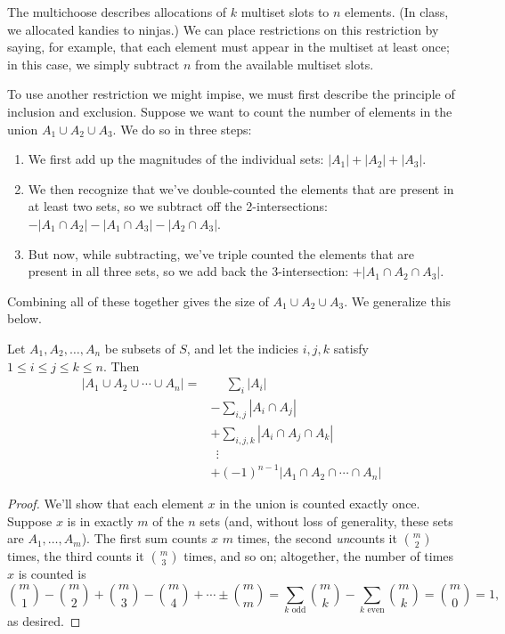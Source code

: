 \documentclass[../m055main.tex]{subfiles}
\begin{document}
The multichoose describes allocations of $k$ multiset slots to $n$ elements.
(In class, we allocated kandies to ninjas.)
We can place restrictions on this restriction by saying, for example, that each element must appear in the multiset at least once; in this case, we simply subtract $n$ from the available multiset slots.

To use another restriction we might impise, we must first describe the principle of inclusion and exclusion.
Suppose we want to count the number of elements in the union $A_1 \cup A_2 \cup A_3$.
We do so in three steps:
\begin{enumerate}
    \item We first add up the magnitudes of the individual sets: $|A_1| + |A_2| + |A_3|$.
    \item We then recognize that we've double-counted the elements that are present in at least two sets, so we subtract off the 2-intersections: $- |A_1 \cap A_2| - |A_1 \cap A_3| - |A_2 \cap A_3|$.
    \item But now, while subtracting, we've triple counted the elements that are present in all three sets, so we add back the 3-intersection: $+ |A_1 \cap A_2 \cap A_3|$.
\end{enumerate}
Combining all of these together gives the size of $A_1 \cup A_2 \cup A_3$.
We generalize this below.

\begin{theorem}
    Let $A_1, A_2, \ldots, A_n$ be subsets of $S$, and let the indicies $i,j,k$ satisfy $1 \leq i \leq j \leq k \leq n$.
    Then
    \begin{align*}
        |A_1 \cup A_2 \cup \cdots \cup A_n| =& \phantom{+}\sum_{i} |A_i| \\
        & - \sum_{i,j} |A_i \cap A_j| \\
        & + \sum_{i,j,k} |A_i \cap A_j \cap A_k| \\
        & \;\,\vdots \\
        & + (-1)^{n-1} |A_1 \cap A_2 \cap \cdots \cap A_n|
    \end{align*}
\end{theorem}

\begin{proof}
    We'll show that each element $x$ in the union is counted exactly once.
    Suppose $x$ is in exactly $m$ of the $n$ sets (and, without loss of generality, these sets are $A_1, \ldots, A_m$).
    The first sum counts $x$ $m$ times, the second \textit{un}counts it ${m \choose 2}$ times, the third counts it ${m \choose 3}$ times, and so on; altogether, the number of times $x$ is counted is
    \[ {m \choose 1} - {m \choose 2} + {m \choose 3} - {m \choose 4} + \cdots \pm {m \choose m} = \sum_{k\text{ odd}} {m \choose k} - \sum_{k\text{ even}} {m \choose k} = {m \choose 0} = 1, \]
    as desired.
\end{proof}
\end{document}
